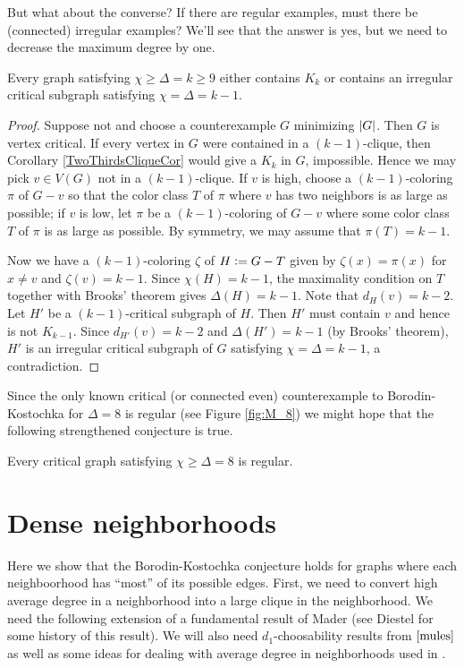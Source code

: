 But what about the converse?  If there are regular examples, must there be
(connected) irregular examples?  We'll see that the answer is yes, but we need
to decrease the maximum degree by one.

\begin{thm}\label{IrregularReduction}
Every graph satisfying $\chi \geq \Delta = k \geq 9$ either
contains $K_k$ or contains an irregular critical subgraph satisfying $\chi
= \Delta = k - 1$.
\end{thm}
\begin{proof}
Suppose not and choose a counterexample $G$ minimizing $\left|G\right|$. Then $G$ is
vertex critical. If every vertex in $G$ were contained in a $(k-1)$-clique, 
then Corollary \ref{TwoThirdsCliqueCor} would give a $K_k$ in $G$, impossible. 
Hence we may pick $v \in V(G)$ not in a $(k-1)$-clique. If $v$ is high, choose a
$(k-1)$-coloring $\pi$ of $G-v$ so that the color class $T$ of $\pi$
where $v$ has two neighbors is as large as possible; if $v$ is low, let $\pi$ be a
$(k-1)$-coloring of $G-v$ where some color class $T$ of $\pi$ is as large as
possible.  By symmetry, we may assume that $\pi(T) = k-1$.  

Now we have a $(k-1)$-coloring $\zeta$ of $H \mathrel{\mathop:}= G-T$ given by $\zeta(x)
= \pi(x)$ for $x \neq v$ and $\zeta(v) = k-1$.  Since $\chi(H) = k - 1$, the
maximality condition on $T$ together with Brooks' theorem gives $\Delta(H) =
k - 1$.  Note that $d_H(v) = k - 2$.  Let $H'$ be a $(k-1)$-critical subgraph of
$H$.  Then $H'$ must contain $v$ and hence is not $K_{k-1}$.  Since $d_{H'}(v) =
k-2$ and $\Delta(H') = k - 1$ (by Brooks' theorem), $H'$ is an irregular
critical subgraph of $G$ satisfying $\chi = \Delta = k - 1$, a contradiction.
\end{proof}

Since the only known critical (or connected even) counterexample to
Borodin-Kostochka for $\Delta = 8$ is regular (see Figure \ref{fig:M_8}) we
might hope that the following strengthened conjecture is true.

\begin{conjecture}\label{EightRegular}
Every critical graph satisfying $\chi \geq \Delta = 8$ is regular.
\end{conjecture}

\section{Dense neighborhoods}
Here we show that the Borodin-Kostochka conjecture holds for graphs where each neighboorhood has ``most'' of its possible edges.  First, we need to convert high average degree in a neighborhood into a large clique in the neighborhood. We need the following extension of a fundamental result of Mader \cite{mader} (see Diestel \cite{diestel2010} for some history of this result).  We will also need $d_1$-choosability results from $\cite{mules}$ as well as some ideas for dealing with average degree in neighborhoods used in \cite{cranstonrabernclaw}.

